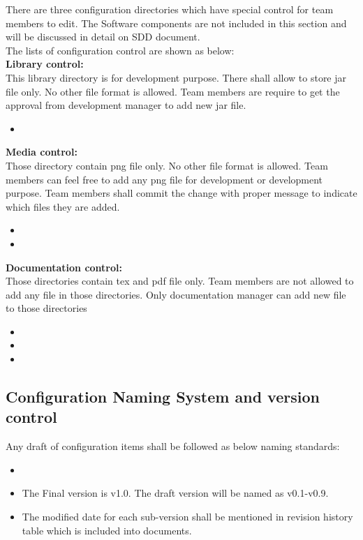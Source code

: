 There are three configuration directories which have special control for team members to edit. The Software components are not included in this section and will be discussed in detail on SDD document.\\
The lists of configuration control are shown as below:\\

\textbf{Library control:}\\
This library directory is for development purpose. There shall allow to store jar file only. No other file format is allowed. Team members are require to get the approval from development manager to add new jar file.\\ 
\begin{itemize}
	\item \texttt{}
\end{itemize}
\textbf{Media control:}\\
Those directory contain png file only. No other file format is allowed. Team members can feel free to add any png file for development or development purpose. Team members shall commit the change with proper message to indicate which files they are added.

\begin{itemize}
	\item \texttt{}
	\item \texttt{}
\end{itemize} 
\textbf{Documentation control:}\\
Those directories contain tex and pdf file only. Team members are not allowed to add any file in those directories.
Only documentation manager can add new file to those directories

\begin{itemize}
	\item \texttt{}
	\item \texttt{}
	\item \texttt{}
\end{itemize}

\subsection{Configuration Naming System and version control}
Any draft of configuration items shall be followed as below naming standards:
\begin{itemize}
	\item \texttt{}\\
      		\texttt{}
	\item The Final version is v1.0. The draft version will be named as v0.1-v0.9.
	\item The modified date for each sub-version shall be mentioned in revision history table which is included into documents.\\
\end{itemize}


